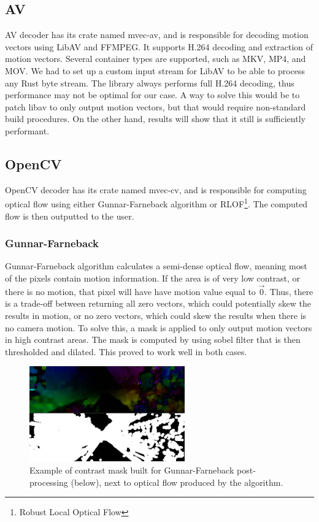 \documentclass[11pt,english]{report}
\begin{document}
\subsection{AV}

AV decoder has its crate named mvec-av, and is responsible for decoding motion vectors using LibAV and FFMPEG. It supports H.264 decoding and extraction of motion vectors. Several container types are supported, such as MKV, MP4, and MOV. We had to set up a custom input stream for LibAV to be able to process any Rust byte stream. The library always performs full H.264 decoding, thus performance may not be optimal for our case. A way to solve this would be to patch libav to only output motion vectors\cite{libav-patch}, but that would require non-standard build procedures. On the other hand, results will show that it still is sufficiently performant.

\subsection{OpenCV}

OpenCV decoder has its crate named mvec-cv, and is responsible for computing optical flow using either Gunnar-Farneback algorithm\cite{Farnebck2003TwoFrameME} or RLOF\footnote{Robust Local Optical Flow}\cite{rlof}. The computed flow is then outputted to the user.

\subsubsection{Gunnar-Farneback}

Gunnar-Farneback algorithm calculates a semi-dense optical flow, meaning most of the pixels contain motion information. If the area is of very low contrast, or there is no motion, that pixel will have have motion value equal to $\overrightarrow{0}$. Thus, there is a trade-off between returning all zero vectors, which could potentially skew the results in motion, or no zero vectors, which could skew the results when there is no camera motion. To solve this, a mask is applied to only output motion vectors in high contrast areas. The mask is computed by using sobel filter that is then thresholded and dilated. This proved to work well in both cases.

\begin{figure}[!ht]
	\centering
	\includegraphics[width=190pt]{docs/report/gunnar-farneback-mask.jpg}
	\caption{\centering Example of contrast mask built for Gunnar-Farneback post-processing (below), next to optical flow produced by the algorithm.}
\end{figure}
\end{document}

